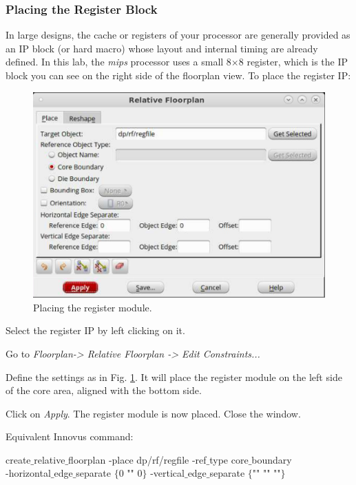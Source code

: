 \subsubsection{Placing the Register Block}
In large designs, the cache or registers of your processor are generally provided as an IP block (or hard macro) whose layout and internal timing are already defined. In this lab, the \textit{mips} processor uses a small 8$\times$8 register, which is the IP block you can see on the right side of the floorplan view. To place the register IP:
\begin{enumerate}
	\parbox[t]{\dimexpr\textwidth-\leftmargin}{%
		\begin{figure}
			\vspace{0mm}
			\centering
			\vspace{-\baselineskip}
			\includegraphics[scale=0.32]{figures/lab5_backend/place_reg}
			\caption{Placing the register module.}
			\label{place_reg}
		\end{figure}
	    \item Select the register IP by left clicking on it.
		\item Go to \textit{Floorplan-> Relative Floorplan -> Edit Constraints...}
		\item Define the settings as in Fig. \ref{place_reg}. It will place the register module on the left side of the core area, aligned with the bottom side.
		\item Click on \textit{Apply}. The register module is now placed. Close the window.
	}

\end{enumerate}
Equivalent Innovus command:
\begin{codeline}
create$\_$relative$\_$floorplan -place dp/rf/regfile -ref$\_$type core$\_$boundary\\
-horizontal$\_$edge$\_$separate $\{$0  ""  0$\}$ -vertical$\_$edge$\_$separate $\{$"" "" ""$\}$
\end{codeline}

